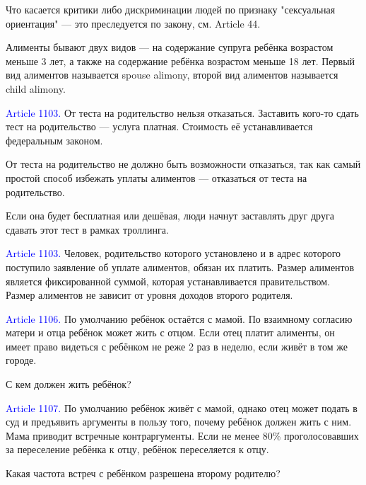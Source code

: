 \documentclass[11pt]{article}
\theoremstyle{remark}
\theoremstyle{definition}
\begin{document}
Что касается критики либо дискриминации людей по признаку "сексуальная ориентация" --- это преследуется по закону, см. Article 44.

\color{black}





Алименты бывают двух видов --- на содержание супруга ребёнка возрастом меньше 3 лет, а также на содержание ребёнка возрастом меньше 18 лет. Первый вид алиментов называется spouse alimony, второй вид алиментов называется child alimony.

\textcolor{blue}{Article 1103.} От теста на родительство нельзя отказаться. Заставить кого-то сдать тест на родительство --- услуга платная. Стоимость её устанавливается федеральным законом. 

\color{blue}

От теста на родительство не должно быть возможности отказаться, так как самый простой способ избежать уплаты алиментов --- отказаться от теста на родительство.

Если она будет бесплатная или дешёвая, люди начнут заставлять друг друга сдавать этот тест в рамках троллинга.

\color{black}

\textcolor{blue}{Article 1103.} Человек, родительство которого установлено и в адрес которого поступило заявление об уплате алиментов, обязан их платить. Размер алиментов является фиксированной суммой, которая устанавливается правительством. Размер алиментов не зависит от уровня доходов второго родителя.

\textcolor{blue}{Article 1106.} По умолчанию ребёнок остаётся с мамой. По взаимному согласию матери и отца ребёнок может жить с отцом. Если отец платит алименты, он имеет право видеться с ребёнком не реже 2 раз в неделю, если живёт в том же городе.

С кем должен жить ребёнок?

\textcolor{blue}{Article 1107.} По умолчанию ребёнок живёт с мамой, однако отец может подать в суд и предъявить аргументы в пользу того, почему ребёнок должен жить с ним. Мама приводит встречные контраргументы. Если не менее 80\% проголосовавших за переселение ребёнка к отцу, ребёнок переселяется к отцу.

Какая частота встреч с ребёнком разрешена второму родителю?
\end{document}
